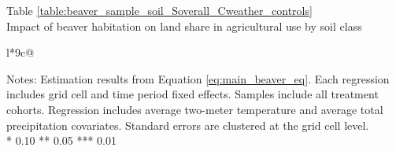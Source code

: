 \begin{table}[t]
\captionlistentry[table]{}
\label{table:beaver_sample_soil_Soverall_Cweather_controls}
\centering
Table \ref{table:beaver_sample_soil_Soverall_Cweather_controls} \\
Impact of beaver habitation on land share in agricultural use by soil class \\
\vspace{0.5em}
\begin{threeparttable}
\begin{tabulary}{\textwidth}{l*{9}{c}@{}}
\toprule \toprule
\noalign{\smallskip}
\noalign{\smallskip}
\midrule \bottomrule
\end{tabulary}
\medskip
\begin{tablenotes}[flushleft]
\setlength{}
\item
\footnotesize
\justify
Notes: Estimation results from Equation \eqref{eq:main_beaver_eq}.
Each regression includes grid cell and time period fixed effects.
Samples include all treatment cohorts. Regression includes average two-meter temperature and average total precipitation covariates.
Standard errors are clustered at the grid cell level. \\
\mbox{*} 0.10 ** 0.05 *** 0.01
\end{tablenotes}
\end{threeparttable}
\end{table}
